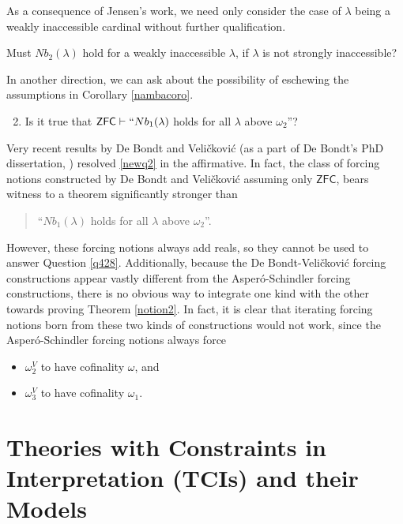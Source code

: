 \documentclass[12pt]{article}
\numberwithin{equation}{section}
\begin{document}
As a consequence of Jensen's work, we need only consider the case of $\lambda$ being a weakly inaccessible cardinal without further qualification.

\begin{ques}\label{q428}
Must $Nb_2(\lambda)$ hold for a weakly inaccessible $\lambda$, if $\lambda$ is not strongly inaccessible?
\end{ques}

In another direction, we can ask about the possibility of eschewing the assumptions in Corollary \ref{nambacoro}.

\begin{enumerate}[label=(Q\arabic*)]
    \setcounter{enumi}{1}
    \item\label{newq2} Is it true that $\mathsf{ZFC} \vdash ``Nb_1(\lambda)$ holds for all $\lambda$ above $\omega_2$''?
\end{enumerate}

Very recent results by De Bondt and Veli\v{c}kovi\'{c} (as a part of De Bondt's PhD dissertation, \cite{bendb}) resolved \ref{newq2} in the affirmative. In fact, the class of forcing notions constructed by De Bondt and Veli\v{c}kovi\'{c} assuming only $\mathsf{ZFC}$, bears witness to a theorem significantly stronger than 
\begin{quote}
    ``$Nb_1(\lambda)$ holds for all $\lambda$ above $\omega_2$''.
\end{quote}
However, these forcing notions always add reals, so they cannot be used to answer Question \ref{q428}. Additionally, because the De Bondt-Veli\v{c}kovi\'{c} forcing constructions appear vastly different from the Asper\'{o}-Schindler forcing constructions, there is no obvious way to integrate one kind with the other towards proving Theorem \ref{notion2}. In fact, it is clear that iterating forcing notions born from these two kinds of constructions would not work, since the Asper\'{o}-Schindler forcing notions always force 
\begin{itemize}
    \item $\omega_2^V$ to have cofinality $\omega$, and
    \item $\omega_3^V$ to have cofinality $\omega_1$.
\end{itemize}

\section{Theories with Constraints in Interpretation (TCIs) and their Models}\label{TCIsec}
\end{document}
